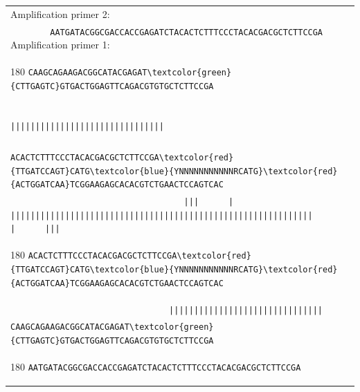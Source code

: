 \documentclass[a4paper,12pt]{article}
\begin{document}
\begin{landscape}
\begin{flushleft}
\begin{tabular}{l}
   \hspace{0.8cm}\scriptsize{Amplification primer 2:}\\[-6pt]
   \Verb+        AATGATACGGCGACCACCGAGATCTACACTCTTTCCCTACACGACGCTCTTCCGA+ \hspace{4.3cm} \scriptsize{Amplification primer 1:}\\[-8pt]
   \begin{turn}{180}
      \Verb+CAAGCAGAAGACGGCATACGAGAT\textcolor{green}{CTTGAGTC}GTGACTGGAGTTCAGACGTGTGCTCTTCCGA                                                                                                        +
   \end{turn}\\[-4pt]
   \Verb+                                                                                                        |||||||||||||||||||||||||||||||+\\[-8pt]
   \Verb+                                 ACACTCTTTCCCTACACGACGCTCTTCCGA\textcolor{red}{TTGATCCAGT}CATG\textcolor{blue}{YNNNNNNNNNNNRCATG}\textcolor{red}{ACTGGATCAA}TCGGAAGAGCACACGTCTGAACTCCAGTCAC+\\[-8pt]
   \Verb+                                   |||      |        |||||||||||||||||||||||||||||||||||||||||||||||||||||||||||||        |      |||+\\[-12pt]
   \begin{turn}{180}
      \Verb+ACACTCTTTCCCTACACGACGCTCTTCCGA\textcolor{red}{TTGATCCAGT}CATG\textcolor{blue}{YNNNNNNNNNNNRCATG}\textcolor{red}{ACTGGATCAA}TCGGAAGAGCACACGTCTGAACTCCAGTCAC                                +
   \end{turn}\\[-4pt]
   \Verb+                                |||||||||||||||||||||||||||||||+\\[-8pt]
   \Verb+CAAGCAGAAGACGGCATACGAGAT\textcolor{green}{CTTGAGTC}GTGACTGGAGTTCAGACGTGTGCTCTTCCGA+\\[-4pt]
   \begin{turn}{180}
      \Verb+AATGATACGGCGACCACCGAGATCTACACTCTTTCCCTACACGACGCTCTTCCGA                                                                                                        +
   \end{turn}\\[-8pt]
\end{tabular}


\end{flushleft}
\end{landscape}
\end{document}
